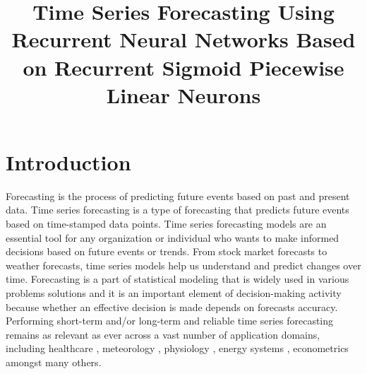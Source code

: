 \documentclass[sn-apa]{sn-jnl}%
\begin{document}
\title[Article Title]{Time Series Forecasting Using Recurrent Neural Networks Based on Recurrent Sigmoid Piecewise Linear Neurons}


\author[1]{ }

\author*[1]{ }





\maketitle

\section{Introduction}\label{sec1}

Forecasting is the process of predicting future events based on past and present data. Time series forecasting is a type of forecasting that predicts future events based on time-stamped data points. Time series forecasting models are an essential tool for any organization or individual who wants to make informed decisions based on future events or trends. From stock market forecasts to weather forecasts, time series models help us understand and predict changes over time. Forecasting is a part of statistical modeling that is widely used in various problems solutions and it is an important element of decision-making activity because whether an effective decision is made depends on forecasts accuracy. Performing short-term and/or long-term and reliable time series forecasting remains as relevant as ever across a vast number of application domains, including healthcare \citep{kaushik2020ai}, meteorology \citep{faisal2022neural}, physiology \citep{ghassemi2015multivariate}, energy systems \citep{amasyali2018review}, econometrics \citep{sineglazov2018forecasting} amongst many others. 
\end{document}
